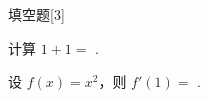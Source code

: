 \documentclass[]{article}
\begin{document}
\makehead
\begin{makepart}{填空题}[3]
  \begin{problem}
    计算 $1+1=$ .
  \end{problem}
  \begin{problem}[5]
    设 $f(x)=x^2$，则 $f'(1)=$ .
  \end{problem}
\end{makepart}
\end{document}
